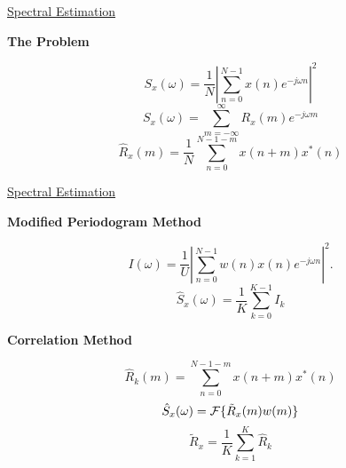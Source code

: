 \begin{slide}
{}
{\tiny\underline{Spectral Estimation}}
\begin{center}
{\bf The Problem}
\end{center}
\vfill
\vbox{
{\tiny
%
$$
S_x(\omega)=\frac{1}{N}|\sum_{n=0}^{N-1}x(n)e^{-j\omega n}|^2
$$
%
\vfil
%
$$
S_x(\omega)=\sum_{m=-\infty}^{\infty}R_x(m)e^{-j\omega m}
$$
%
\vfil
%
$$
\hat{R}_x(m)=\frac{1}{N}\sum_{n=0}^{N-1-m}x(n+m)x^*(n)
$$
%
}}
\vfill
\vbox{
}
\vfill
\end{slide}
\begin{slide}
{}
{\tiny\underline{Spectral Estimation}}
\begin{center}
{\bf Modified Periodogram Method}
\end{center}
\vfill
\vbox{
{\tiny
%
$$
I(\omega)=\frac{1}{U}|\sum_{n=0}^{N-1}w(n)x(n)e^{-j\omega n}|^2.
$$
%
\vfil
%
$$
\hat{S}_x(\omega)=\frac{1}{K}\sum_{k=0}^{K-1}I_k
$$
%
}}
\vfill
\begin{center}
{\bf Correlation Method}
\end{center}
\vfill
\vbox{
{\tiny
%
$$
\hat{R}_k(m)=\sum_{n=0}^{N-1-m}x(n+m)x^*(n)
$$
%
\vfil
%
$$
\hat{S}_x(\omega)={\cal F}\{\tilde{R}_x(m)w(m)\}
$$
%
\vfil
%
$$
\tilde{R}_x=\frac{1}{K}\sum_{k=1}^{K}\hat{R}_k
$$
%
}}
\vfill
\end{slide}

